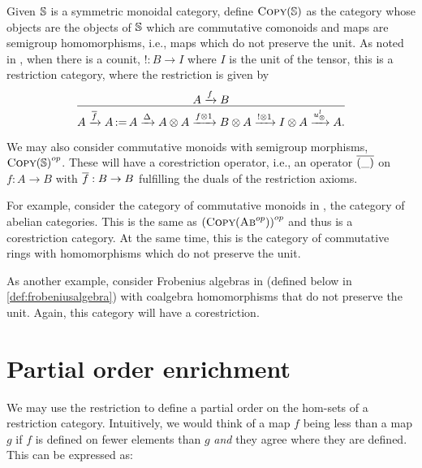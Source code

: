 \begin{example}\label{ex:algebras-not-preserving-unit-as-restriction-cat}
  Given $\mathbb{S}$ is a symmetric monoidal category, define $\textsc{Copy}(\mathbb{S})$ as the category
  whose objects are the objects of $\mathbb{S}$ which are commutative comonoids and maps are semigroup
  homomorphisms, i.e., maps which do not preserve the unit. As noted in
  \cite{cockett2002:restcategories1}, when there is a counit, $!:B\to I$ where $I$ is the unit of
  the tensor, this is a restriction category, where the restriction is given by
  \[
    \infer{A\xrightarrow{\rst{f}}A \definedas A \xrightarrow{\Delta} A\*A \xrightarrow{f\*1} B\* A
      \xrightarrow{!\*1} I\*A \xrightarrow{\usl} A.}{A\xrightarrow{f}B}
  \]

  We may also consider commutative monoids with semigroup morphisms,
  ${\textsc{Copy}(\mathbb{S})}^{op}$. These will have a corestriction operator, i.e., an operator
  $\overline{(\_)}$ on $f:A\to B$ with $\overline{f}:B\to B$ fulfilling the duals of the restriction axioms.


  For example, consider the category of commutative monoids in \Ab, the category of abelian
  categories. This is the same as ${(\textsc{Copy}({\textsc{Ab}}^{op}))}^{op}$ and thus is a corestriction
  category. At the same time, this is the category of commutative rings with homomorphisms which do
  not preserve the unit.

  As another example, consider Frobenius algebras in \cS (defined below in
  \ref{def:frobeniusalgebra}) with coalgebra homomorphisms that do not preserve the unit. Again,
  this category will have a corestriction.
\end{example}

\section{Partial order enrichment} %
\label{sub:enrichment_in_restriction_categories}

We may use the restriction to define a partial order on the hom-sets of a restriction
category. Intuitively, we would think of a map $f$ being less than a map $g$ if $f$ is
defined on fewer elements than $g$ \emph{and} they agree where they are defined. This can be
expressed as:


